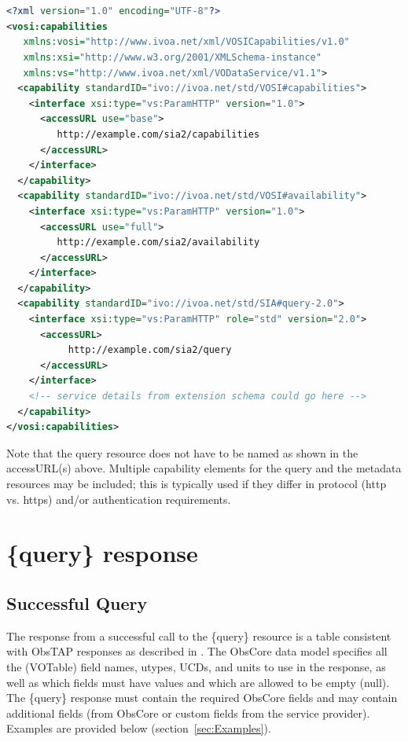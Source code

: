 \documentclass[11pt,a4paper]{ivoa}
\begin{document}
\begin{lstlisting}[language=XML]


<?xml version="1.0" encoding="UTF-8"?>
<vosi:capabilities 
   xmlns:vosi="http://www.ivoa.net/xml/VOSICapabilities/v1.0" 
   xmlns:xsi="http://www.w3.org/2001/XMLSchema-instance" 
   xmlns:vs="http://www.ivoa.net/xml/VODataService/v1.1">
  <capability standardID="ivo://ivoa.net/std/VOSI#capabilities">
    <interface xsi:type="vs:ParamHTTP" version="1.0">
      <accessURL use="base">
         http://example.com/sia2/capabilities
      </accessURL>
    </interface>
  </capability>
  <capability standardID="ivo://ivoa.net/std/VOSI#availability">
    <interface xsi:type="vs:ParamHTTP" version="1.0">
      <accessURL use="full">
         http://example.com/sia2/availability
      </accessURL>
    </interface>
  </capability>
  <capability standardID="ivo://ivoa.net/std/SIA#query-2.0">
    <interface xsi:type="vs:ParamHTTP" role="std" version="2.0">
      <accessURL>
           http://example.com/sia2/query
      </accessURL>
    </interface>
    <!-- service details from extension schema could go here -->
  </capability>
</vosi:capabilities>
\end{lstlisting}

Note that the {query} resource does not have to be named as shown in the accessURL(s) above. Multiple capability elements for the {query} and the {metadata} resources may be included; this is typically used if they differ in protocol (http vs. https) and/or authentication requirements.

\section{\{query\} response}
\label{sec:queryresponse}

\subsection{Successful Query}
\label{sec:succesful}

The response from a successful call to the \{query\} resource is a table consistent with  ObsTAP responses as described in \cite{std:OBSCORE}. The ObsCore data model specifies all the (VOTable) field names, utypes, UCDs, and units to use in the response, as well as which fields must have values and which are allowed to be empty (null). The \{query\} response must contain the required ObsCore fields and may contain additional fields (from ObsCore or custom fields from the service provider). Examples are provided below (section~\ref{sec:Examples}).
\end{document}
